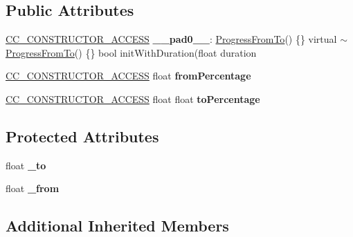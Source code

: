 \subsection*{Public Attributes}
\begin{DoxyCompactItemize}
\item 
\mbox{\label{classProgressFromTo_aa35f2c965e333d289fc0e93dea16d6b7}} 
\hyperlink{_2cocos2d_2cocos_2base_2ccConfig_8h_a25ef1314f97c35a2ed3d029b0ead6da0}{C\+C\+\_\+\+C\+O\+N\+S\+T\+R\+U\+C\+T\+O\+R\+\_\+\+A\+C\+C\+E\+SS} {\bfseries \+\_\+\+\_\+pad0\+\_\+\+\_\+}\+: \hyperlink{classProgressFromTo}{Progress\+From\+To}() \{\} virtual $\sim$\hyperlink{classProgressFromTo}{Progress\+From\+To}() \{\} bool init\+With\+Duration(float duration
\item 
\mbox{\label{classProgressFromTo_a6b739a00cb644412dffb050852ca0f58}} 
\hyperlink{_2cocos2d_2cocos_2base_2ccConfig_8h_a25ef1314f97c35a2ed3d029b0ead6da0}{C\+C\+\_\+\+C\+O\+N\+S\+T\+R\+U\+C\+T\+O\+R\+\_\+\+A\+C\+C\+E\+SS} float {\bfseries from\+Percentage}
\item 
\mbox{\label{classProgressFromTo_a48cf61e9fb415aa1c482740c79363fed}} 
\hyperlink{_2cocos2d_2cocos_2base_2ccConfig_8h_a25ef1314f97c35a2ed3d029b0ead6da0}{C\+C\+\_\+\+C\+O\+N\+S\+T\+R\+U\+C\+T\+O\+R\+\_\+\+A\+C\+C\+E\+SS} float float {\bfseries to\+Percentage}
\end{DoxyCompactItemize}
\subsection*{Protected Attributes}
\begin{DoxyCompactItemize}
\item 
\mbox{\label{classProgressFromTo_a97ee5c7f72ed6014b752c821b7c2b1c2}} 
float {\bfseries \+\_\+to}
\item 
\mbox{\label{classProgressFromTo_ae42308d1785c4e18977bc112f2a60e6b}} 
float {\bfseries \+\_\+from}
\end{DoxyCompactItemize}
\subsection*{Additional Inherited Members}



